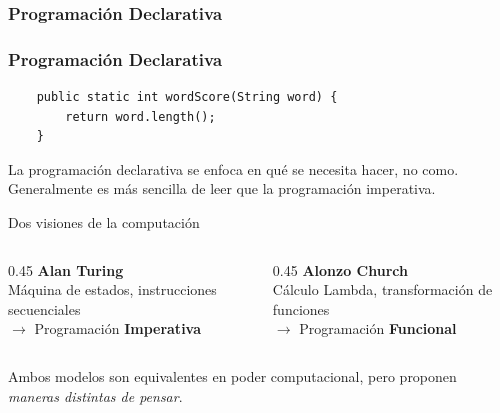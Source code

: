 \documentclass{beamer}
\begin{document}
\subsubsection{Programación Declarativa}
\begin{frame}[fragile]
    \frametitle{Programación Declarativa }

    \begin{lstlisting}
    public static int wordScore(String word) {
        return word.length();
    }
    \end{lstlisting}
    \vspace{0.5cm}
    \small
    La programación declarativa se enfoca en qué se necesita hacer, no como.\\
    Generalmente es más sencilla de leer que la programación imperativa.
\end{frame}

\begin{frame}{Dos visiones de la computación}
    \begin{columns}
        \begin{column}{0.45\textwidth}
            \centering
            \textbf{Alan Turing} \\
            \vspace{0.3em}
            Máquina de estados, instrucciones secuenciales \\
            \vspace{0.3em}
            \small $\rightarrow$ Programación \textbf{Imperativa}
        \end{column}
        \begin{column}{0.45\textwidth}
            \centering
            \textbf{Alonzo Church} \\
            \vspace{0.3em}
            Cálculo Lambda, transformación de funciones \\
            \vspace{0.3em}
            \small $\rightarrow$ Programación \textbf{Funcional}
        \end{column}
    \end{columns}
    \vspace{0.8em}
    \begin{alertblock}{}
        \centering
        \small Ambos modelos son equivalentes en poder computacional, pero proponen \textit{maneras distintas de pensar}.
    \end{alertblock}
\end{frame}
\end{document}
